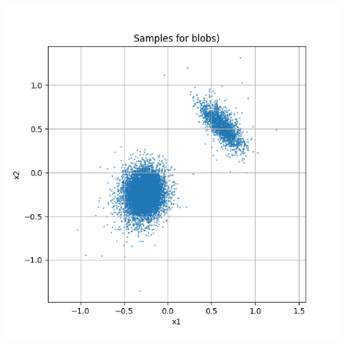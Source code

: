 \documentclass[a4paper,12pt]{article}
\begin{document}
\begin{figure}[h]
\begin{minipage}{0.3\textwidth}
  \end{minipage}
  \begin{minipage}{0.3\textwidth}
      \centering
      \includegraphics[width=\linewidth]{"images/Samples for ddpm_2_50_0.0001_0.02_blobs.png"}
  \end{minipage}

  \vspace{0.5cm}


\end{figure}
\end{document}

